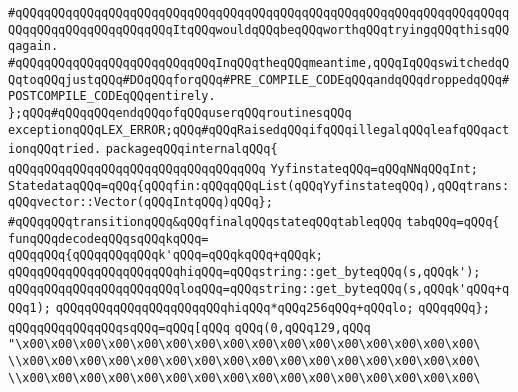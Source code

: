 \verb|#qQQqqQQqqQQqqQQqqQQqqQQqqQQqqQQqqQQqqQQqqQQqqQQqqQQqqQQqqQQqqQQqqQQqqQQqqQQqqQQqqQQqqQQqqQQqItqQQqwouldqQQqbeqQQqworthqQQqtryingqQQqthisqQQqagain.|\newline
\verb|#qQQqqQQqqQQqqQQqqQQqqQQqqQQqInqQQqtheqQQqmeantime,qQQqIqQQqswitchedqQQqtoqQQqjustqQQq#DOqQQqforqQQq#PRE_COMPILE_CODEqQQqandqQQqdroppedqQQq#POSTCOMPILE_CODEqQQqentirely.|\newline
\newline
\newline
\newline
\verb|};qQQq#qQQqqQQqendqQQqofqQQquserqQQqroutinesqQQq|\newline
\verb|exceptionqQQqLEX_ERROR;qQQq#qQQqRaisedqQQqifqQQqillegalqQQqleafqQQqactionqQQqtried.|\newline
\verb|packageqQQqinternalqQQq{|\newline
\verb|qQQqqQQqqQQqqQQqqQQqqQQqqQQqqQQqqQQq|\newline
\newline
\verb|YyfinstateqQQq=qQQqNNqQQqInt;|\newline
\verb|StatedataqQQq=qQQq{qQQqfin:qQQqqQQqList(qQQqYyfinstateqQQq),qQQqtrans:qQQqvector::Vector(qQQqIntqQQq)qQQq};|\newline
\verb|#qQQqqQQqtransitionqQQq&qQQqfinalqQQqstateqQQqtableqQQq|\newline
\verb|tabqQQq=qQQq{|\newline
\verb|funqQQqdecodeqQQqsqQQqkqQQq=|\newline
\verb|qQQqqQQq{qQQqqQQqqQQqk'qQQq=qQQqkqQQq+qQQqk;|\newline
\verb|qQQqqQQqqQQqqQQqqQQqqQQqhiqQQq=qQQqstring::get_byteqQQq(s,qQQqk');|\newline
\verb|qQQqqQQqqQQqqQQqqQQqqQQqloqQQq=qQQqstring::get_byteqQQq(s,qQQqk'qQQq+qQQq1);|\newline
\newline
\verb|qQQqqQQqqQQqqQQqqQQqqQQqhiqQQq*qQQq256qQQq+qQQqlo;|\newline
\verb|qQQqqQQq};|\newline
\verb|qQQqqQQqqQQqqQQqsqQQq=qQQq[qQQq|\newline
\verb|qQQq(0,qQQq129,qQQq|\newline
\verb|"\x00\x00\x00\x00\x00\x00\x00\x00\x00\x00\x00\x00\x00\x00\x00\x00\|\newline
\verb|\\x00\x00\x00\x00\x00\x00\x00\x00\x00\x00\x00\x00\x00\x00\x00\x00\|\newline
\verb|\\x00\x00\x00\x00\x00\x00\x00\x00\x00\x00\x00\x00\x00\x00\x00\x00\|\newline

